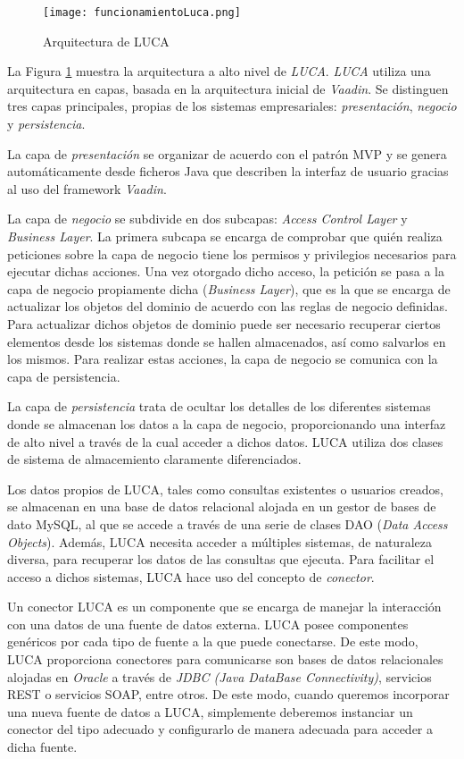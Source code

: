 \begin{figure}[!tb]
	\centering
	\texttt{[image: funcionamientoLuca.png]}
	\caption{Arquitectura de LUCA}
    \label{fig:funcionamientoLuca}
\end{figure}

La Figura \ref{fig:funcionamientoLuca} muestra la arquitectura a alto nivel de \emph{LUCA}. \emph{LUCA} utiliza una arquitectura en capas, basada en la arquitectura inicial de \emph{Vaadin}. Se distinguen tres capas principales, propias de los sistemas empresariales: \emph{presentación}, \emph{negocio} y \emph{persistencia}.

La capa de \emph{presentación} se organizar de acuerdo con el patrón MVP y se genera automáticamente desde ficheros Java que describen la interfaz de usuario gracias al uso del framework \emph{Vaadin}.

La capa de \emph{negocio} se subdivide en dos subcapas: \emph{Access Control Layer} y \emph{Business Layer}. La primera subcapa se encarga de comprobar que quién realiza peticiones sobre la capa de negocio tiene los permisos y privilegios necesarios para ejecutar dichas acciones. Una vez otorgado dicho acceso, la petición se pasa a la capa de negocio propiamente dicha (\emph{Business Layer}), que es la que se encarga de actualizar los objetos del dominio de acuerdo con las reglas de negocio definidas. Para actualizar dichos objetos de dominio puede ser necesario recuperar ciertos elementos desde los sistemas donde se hallen almacenados, así como salvarlos en los mismos. Para realizar estas acciones, la capa de negocio se comunica con la capa de persistencia. 

La capa de \emph{persistencia} trata de ocultar los detalles de los diferentes sistemas donde se almacenan los datos a la capa de negocio, proporcionando una interfaz de alto nivel a través de la cual acceder a dichos datos. LUCA utiliza dos clases de sistema de almacemiento claramente diferenciados. 

Los datos propios de LUCA, tales como consultas existentes o usuarios creados, se almacenan en una base de datos relacional alojada en un gestor de bases de dato MySQL, al que se accede a través de una serie de clases DAO (\emph{Data Access Objects}). Además, LUCA necesita acceder a múltiples sistemas, de naturaleza diversa, para recuperar los datos de las consultas que ejecuta. Para facilitar el acceso a dichos sistemas, LUCA hace uso del concepto de \emph{conector}.

Un conector LUCA es un componente que se encarga de manejar la interacción con una datos de una fuente de datos externa. LUCA posee componentes genéricos por cada tipo de fuente a la que puede conectarse. De este modo, LUCA proporciona conectores para comunicarse son bases de datos relacionales alojadas en \emph{Oracle} a través de \emph{JDBC (Java DataBase Connectivity)}, servicios REST o servicios SOAP, entre otros. De este modo, cuando queremos incorporar una nueva fuente de datos a LUCA, simplemente deberemos instanciar un conector del tipo adecuado y configurarlo de manera adecuada para acceder a dicha fuente.








